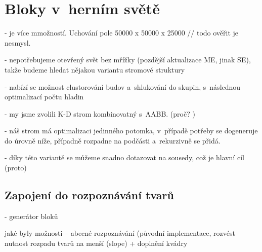 
\section{Bloky v~herním světě}


- je více mmožností. Uchování pole 50000 x 50000 x 25000 // todo ověřit
je nesmysl. 

- nepotřebujeme otevřený svět bez mřížky (pozdější aktualizace ME, jinak SE), takže budeme hledat nějakou variantu stromové struktury

- nabízí se možnost clustorování budov a~shlukování do skupin, s~následnou optimalizací počtu hladin

- my jsme zvolili K-D strom kombinovatný s~AABB. (proč? )

- náš strom má optimalizaci jedinného potomka, v~případě potřeby se dogeneruje do úrovně níže, případně rozpadne na podčásti a~rekurzivně se přidá.

- díky této variantě se můžeme snadno dotazovat na sousedy, což je hlavní cíl (proto)



\subsection{Zapojení do rozpoznávání tvarů}

- generátor bloků

jaké byly možnosti -- abecné rozpoznávání (původní implementace, rozvést nutnost rozpadu tvarů na menší (slope) + doplnění kvádry

